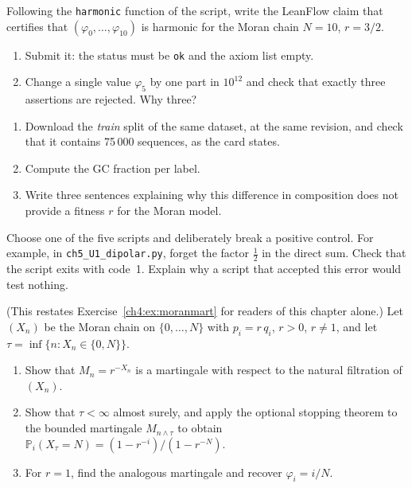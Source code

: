 \begin{exercise}[U5, LeanFlow, (S)]\label{ch5:ex:U5b}
Following the \texttt{harmonic} function of the script, write the LeanFlow claim that certifies that
$(\varphi_0,\dots,\varphi_{10})$ is harmonic for the Moran chain $N=10$, $r=3/2$.
\begin{enumerate}
\item Submit it: the status must be \texttt{ok} and the axiom list empty.
\item Change a single value $\varphi_5$ by one part in $10^{12}$ and check that exactly three assertions are
rejected. Why three?
\end{enumerate}
\end{exercise}

\begin{exercise}[U5, data, (S)]\label{ch5:ex:U5c}
\begin{enumerate}
\item Download the \emph{train} split of the same dataset, at the same revision, and check that it contains 75\,000 sequences,
as the card states.
\item Compute the GC fraction per label.
\item Write three sentences explaining why this difference in composition does not provide a fitness
$r$ for the Moran model.
\end{enumerate}
\end{exercise}

\begin{exercise}[Controls, (S)]\label{ch5:ex:temoins}
Choose one of the five scripts and deliberately break a positive control. For example, in
\texttt{ch5\_U1\_dipolar.py}, forget the factor $\tfrac12$ in the direct sum. Check that the script exits with
code~1. Explain why a script that accepted this error would test nothing.
\end{exercise}

\begin{exercise}
(This restates Exercise~\ref{ch4:ex:moranmart} for readers of this chapter alone.)
Let $(X_n)$ be the Moran chain on $\{0,\dots,N\}$ with $p_i=r\,q_i$, $r>0$, $r\ne1$, and let
$\tau=\inf\{n:X_n\in\{0,N\}\}$.
\begin{enumerate}
\item Show that $M_n=r^{-X_n}$ is a martingale with respect to the natural filtration of $(X_n)$.
\item Show that $\tau<\infty$ almost surely, and apply the optional stopping theorem to the bounded martingale
$M_{n\wedge\tau}$ to obtain $\mathbb P_i(X_\tau=N)=(1-r^{-i})/(1-r^{-N})$.
\item For $r=1$, find the analogous martingale and recover $\varphi_i=i/N$.
\end{enumerate}
\end{exercise}

